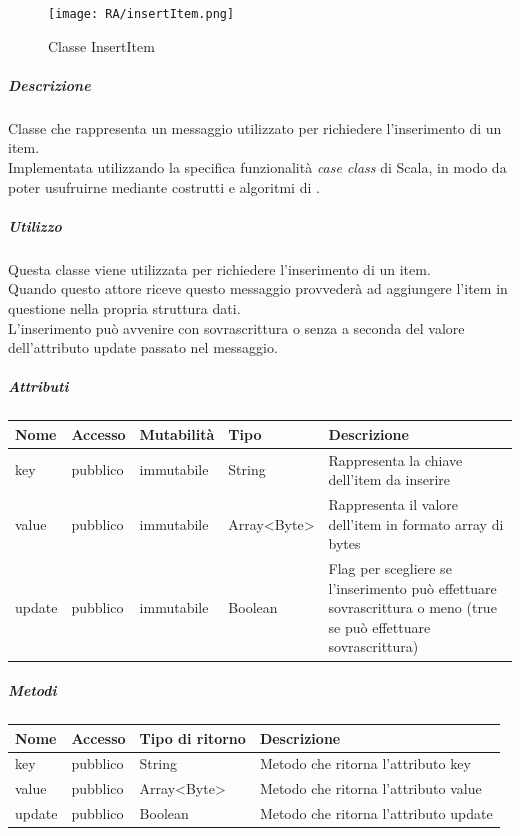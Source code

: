 \documentclass{scalatekids-article}
\begin{document}
\begin{figure}[H]
  \begin{center}
    \texttt{[image: RA/insertItem.png]}
    \caption{Classe InsertItem}
  \end{center}
\end{figure}

\subparagraph{Descrizione}
Classe che rappresenta un messaggio utilizzato per richiedere l'inserimento di
un item.\\Implementata utilizzando la specifica funzionalità \textit{case class} di Scala,
in modo da poter usufruirne mediante costrutti e algoritmi di
.

\subparagraph{Utilizzo}
Questa classe viene utilizzata per richiedere l'inserimento di un item.\\Quando questo attore riceve questo messaggio provvederà ad aggiungere l'item in
questione nella propria struttura dati.\\L'inserimento può avvenire con
sovrascrittura o senza a seconda del valore dell'attributo update passato nel
messaggio.

\subparagraph{Attributi}
\begin{tabular}{| p{2cm} | p{1.5cm} | p{2cm} | p{3cm} | p{8.5cm} |}
  \hline
  Nome & Accesso & Mutabilità & Tipo & Descrizione\\
  \hline
  key & pubblico & immutabile & String & Rappresenta la chiave dell'item da inserire\\
  \hline
  value & pubblico & immutabile & Array<Byte> & Rappresenta il valore dell'item in formato array di bytes\\
  \hline
  update & pubblico & immutabile & Boolean & Flag per scegliere se l'inserimento può effettuare sovrascrittura o meno (true se può effettuare sovrascrittura)\\
  \hline
\end{tabular}

\subparagraph{Metodi}
\begin{tabular}{| p{3cm} | p{1.5cm} | p{3.5cm} | p{9cm} |}
  \hline
  Nome & Accesso & Tipo di ritorno & Descrizione\\
  \hline
  key & pubblico & String & Metodo che ritorna l'attributo key\\
  \hline
  value & pubblico & Array<Byte> & Metodo che ritorna l'attributo value\\
  \hline
  update & pubblico & Boolean & Metodo che ritorna l'attributo update\\
  \hline
\end{tabular}
\end{document}
